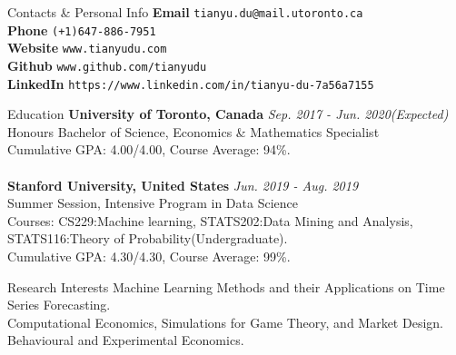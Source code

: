 \documentclass{resume} %
\begin{document}
\begin{rSection}{Contacts \& Personal Info}
	\textbf{Email} \texttt{tianyu.du@mail.utoronto.ca}
	\\
	\textbf{Phone} \texttt{(+1)647-886-7951}
	\\
	\textbf{Website} \texttt{www.tianyudu.com}
	\\
	\textbf{Github} \texttt{www.github.com/tianyudu}
	\\
	\textbf{LinkedIn} \texttt{https://www.linkedin.com/in/tianyu-du-7a56a7155}
\end{rSection}


\begin{rSection}{Education}
{\bf University of Toronto, Canada} \hfill {\em Sep. 2017 - Jun. 2020(Expected)} 
\\ Honours Bachelor of Science, Economics \& Mathematics Specialist
\\ Cumulative GPA: 4.00/4.00, Course Average: 94\%.
\\
\\{\bf Stanford University, United States} \hfill {\em Jun. 2019 - Aug. 2019} 
\\ Summer Session, Intensive Program in Data Science
\\ Courses: CS229:Machine learning, STATS202:Data Mining and Analysis, STATS116:Theory of Probability(Undergraduate).
\\ Cumulative GPA: 4.30/4.30, Course Average: 99\%.
\end{rSection}

\begin{rSection}{Research Interests}
Machine Learning Methods and their Applications on Time Series Forecasting.
\\Computational Economics, Simulations for Game Theory, and Market Design.
\\Behavioural and Experimental Economics.
\end{rSection}
\end{document}
